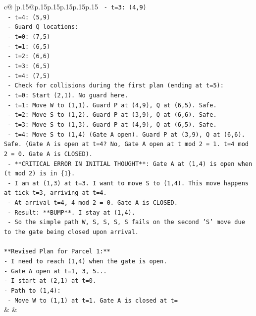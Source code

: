\documentclass{article}
\begin{document}
{\begin{supertabular}{c@{$\;$}|p{.15\linewidth}@{}p{.15\linewidth}p{.15\linewidth}p{.15\linewidth}p{.15\linewidth}p{.15\linewidth}}
{{{\texttt{    {-} t=3: (4,9)} \\
\texttt{    {-} t=4: (5,9)} \\
\texttt{  {-} Guard Q locations:} \\
\texttt{    {-} t=0: (7,5)} \\
\texttt{    {-} t=1: (6,5)} \\
\texttt{    {-} t=2: (6,6)} \\
\texttt{    {-} t=3: (6,5)} \\
\texttt{    {-} t=4: (7,5)} \\
\texttt{  {-} Check for collisions during the first plan (ending at t=5):} \\
\texttt{    {-} t=0: Start (2,1). No guard here.} \\
\texttt{    {-} t=1: Move W to (1,1). Guard P at (4,9), Q at (6,5). Safe.} \\
\texttt{    {-} t=2: Move S to (1,2). Guard P at (3,9), Q at (6,6). Safe.} \\
\texttt{    {-} t=3: Move S to (1,3). Guard P at (4,9), Q at (6,5). Safe.} \\
\texttt{    {-} t=4: Move S to (1,4) (Gate A open). Guard P at (3,9), Q at (6,6). Safe. (Gate A is open at t=4? No, Gate A open at t mod 2 = 1. t=4 mod 2 = 0. Gate A is CLOSED).} \\
\texttt{      {-} **CRITICAL ERROR IN INITIAL THOUGHT**: Gate A at (1,4) is open when (t mod 2) is in \{1\}.} \\
\texttt{      {-} I am at (1,3) at t=3. I want to move S to (1,4). This move happens at tick t=3, arriving at t=4.} \\
\texttt{      {-} At arrival t=4, 4 mod 2 = 0. Gate A is CLOSED.} \\
\texttt{      {-} Result: **BUMP**. I stay at (1,4).} \\
\texttt{  {-} So the simple path W, S, S, S, S fails on the second 'S' move due to the gate being closed upon arrival.} \\
\\ 
\texttt{**Revised Plan for Parcel 1:**} \\
\texttt{{-} I need to reach (1,4) when the gate is open.} \\
\texttt{{-} Gate A open at t=1, 3, 5...} \\
\texttt{{-} I start at (2,1) at t=0.} \\
\texttt{{-} Path to (1,4):} \\
\texttt{  {-} Move W to (1,1) at t=1. Gate A is closed at t=} \\
            }
        }
    }
    & & \\ \\


\end{supertabular}}
\end{document}
